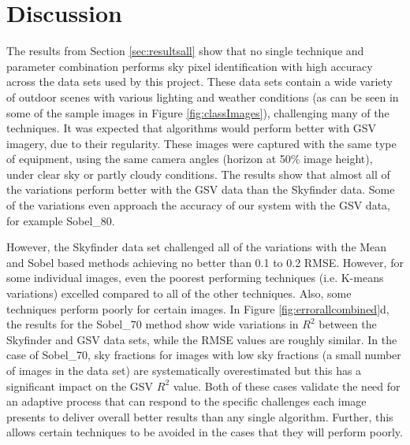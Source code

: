 \documentclass[final,3p,times,authoryear]{elsarticle}
\begin{document}
\section{Discussion}\label{sec:discussion}

The results from Section \ref{sec:resultsall} show that no single technique and parameter combination performs sky pixel identification with high accuracy across the data sets used by this project. These data sets contain a wide variety of outdoor scenes with various lighting and weather conditions (as can be seen in some of the sample images in Figure \ref{fig:classImages}), challenging many of the techniques. It was expected that algorithms would perform better with GSV imagery, due to their regularity. These images were captured with the same type of equipment, using the same camera angles (horizon at 50\% image height), under clear sky or partly cloudy conditions. The results show that almost all of the variations perform better with the GSV data than the Skyfinder data. Some of the variations even approach the accuracy of our system with the GSV data, for example Sobel\_80. 

However, the Skyfinder data set challenged all of the variations with the Mean and Sobel based methods achieving no better than 0.1 to 0.2 RMSE. However, for some individual images, even the poorest performing techniques (i.e. K-means variations) excelled compared to all of the other techniques. Also, some techniques perform poorly for certain images. In Figure \ref{fig:errorallcombined}d, the results for the Sobel\_70 method show wide variations in $R^{2}$ between the Skyfinder and GSV data sets, while the RMSE values are roughly similar. In the case of Sobel\_70, sky fractions for images with low sky fractions (a small number of images in the data set) are systematically overestimated but this has a significant impact on the GSV $R^{2}$ value. Both of these cases validate the need for an adaptive process that can respond to the specific challenges each image presents to deliver overall better results than any single algorithm. Further, this allows certain techniques to be avoided in the cases that they will perform poorly.
\end{document}
